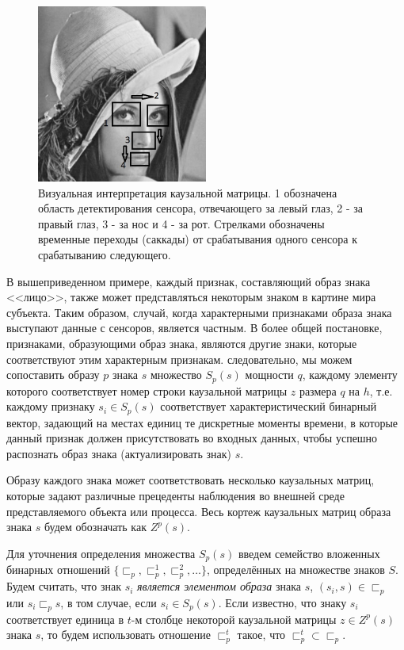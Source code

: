 \documentclass[12pt]{scrartcl}
\begin{document}
	\begin{figure}
		\label{fig:face}
		\centering
		\includegraphics[width=0.5\textwidth]{misc/photos/face}
		\caption{Визуальная интерпретация каузальной матрицы. 1 обозначена область детектирования сенсора, отвечающего за левый глаз, 2 - за правый глаз, 3 - за нос и 4 - за рот. Стрелками обозначены временные переходы (саккады) от срабатывания одного сенсора к срабатыванию следующего.}		
	\end{figure}

	В вышеприведенном примере, каждый признак, составляющий образ знака <<лицо>>, также может представляться некоторым знаком в картине мира субъекта. Таким образом, случай, когда характерными признаками образа знака выступают данные с сенсоров, является частным. В более общей постановке, признаками, образующими образ знака, являются другие знаки, которые соответствуют этим характерным признакам. следовательно, мы можем сопоставить образу $p$ знака $s$ множество $S_p(s)$ мощности $q$, каждому элементу которого соответствует номер строки каузальной матрицы $z$ размера $q$ на $h$, т.е. каждому признаку $s_i\in S_p(s)$ соответствует характеристический бинарный вектор, задающий на местах единиц те дискретные моменты времени, в которые данный признак должен присутствовать во входных данных, чтобы успешно распознать образ знака (актуализировать знак) $s$. 
	
	Образу каждого знака может соответствовать несколько каузальных матриц, которые задают различные прецеденты наблюдения во внешней среде представляемого объекта или процесса. Весь кортеж каузальных матриц образа знака $s$ будем обозначать как $Z^p(s)$. 
		
	Для уточнения определения множества $S_p(s)$ введем семейство вложенных бинарных отношений $\{\sqsubset_p,\sqsubset_p^1,\sqsubset_p^2,\dots\}$, определённых на множестве знаков $S$. Будем считать, что знак $s_i$ \textit{является элементом образа} знака $s$, $(s_i,s)\in\sqsubset_p$ или $s_i\sqsubset_p s$, в том случае, если $s_i\in S_p(s)$. Если известно, что знаку $s_i$ соответствует единица в $t$-м столбце некоторой каузальной матрицы $z\in Z^p(s)$ знака $s$, то будем использовать отношение $\sqsubset_p^t$ такое, что  $\sqsubset_p^t\subset \sqsubset_p$.
	
\end{document}
